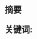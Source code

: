 
\setcounter{page}{1}
\pagestyle{artimain}

\begin{center}
\textbf{\heiti \titlethesisCHN}
\\[2em]
\textbf{\heiti 摘\quad 要}
\end{center}

\vspace{2em}\songti 
\vspace{2em}\par\textbf{\heiti 关键词: }